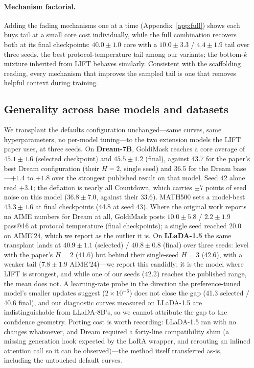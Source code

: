 \documentclass{article} %
\begin{document}
\paragraph{Mechanism factorial.} Adding the fading mechanisms one at a time (Appendix~\ref{app:full}) shows each buys tail at a small core cost individually, while the full combination recovers both at its final checkpoints: $40.0 \pm 1.0$ core with a $10.0 \pm 3.3$ / $4.4 \pm 1.9$ tail over three seeds, the best protocol-temperature tail among our variants; the bottom-$k$ mixture inherited from LIFT behaves similarly. Consistent with the scaffolding reading, every mechanism that improves the sampled tail is one that removes helpful context during training.

\subsection{Generality across base models and datasets}
\label{sec:generality}

We transplant the defaults configuration unchanged---same curves, same hyperparameters, no per-model tuning---to the two extension models the LIFT paper uses, at three seeds. On \textbf{Dream-7B}, GoldiMask reaches a core average of $45.1 \pm 1.6$ (selected checkpoint) and $45.5 \pm 1.2$ (final), against 43.7 for the paper's best Dream configuration (their $H{=}2$, single seed) and 36.5 for the Dream base---$+1.4$ to $+1.8$ over the strongest published result on that model. Seed 42 alone read $+3.1$; the deflation is nearly all Countdown, which carries $\pm 7$ points of seed noise on this model ($36.8 \pm 7.0$, against their 33.6). MATH500 sets a model-best $43.3 \pm 1.6$ at final checkpoints (44.8 at seed 43). Where the original work reports no AIME numbers for Dream at all, GoldiMask posts $10.0 \pm 5.8$ / $2.2 \pm 1.9$ pass@16 at protocol temperature (final checkpoints); a single seed reached 20.0 on AIME'24, which we report as the outlier it is. On \textbf{LLaDA-1.5} the same transplant lands at $40.9 \pm 1.1$ (selected) / $40.8 \pm 0.8$ (final) over three seeds: level with the paper's $H{=}2$ (41.6) but behind their single-seed $H{=}3$ (42.6), with a weaker tail ($7.8 \pm 1.9$ AIME'24)---we report this candidly; it is the model where LIFT is strongest, and while one of our seeds (42.2) reaches the published range, the mean does not. A learning-rate probe in the direction the preference-tuned model's smaller updates suggest ($2 \times 10^{-6}$) does not close the gap (41.3 selected / 40.6 final), and our diagnostic curves measured on LLaDA-1.5 are indistinguishable from LLaDA-8B's, so we cannot attribute the gap to the confidence geometry. Porting cost is worth recording: LLaDA-1.5 ran with no changes whatsoever, and Dream required a forty-line compatibility shim (a missing generation hook expected by the LoRA wrapper, and rerouting an inlined attention call so it can be observed)---the method itself transferred as-is, including the untouched default curves.
\end{document}
